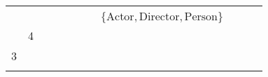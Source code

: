 \begin{table}[]
{\begin{tabular}{lllllllllll}
                          &                           &                   &                                                                          & \cellcolor[HTML]{FC8D59} &                           &                                                             &                                                                            &                                                                           &                                 &                                                                        \\
                          &                           &                   &                                                                          &                                                                        &                           &                                                             & \cellcolor[HTML]{FC8D59}$\{\text{Actor}, \text{Director}, \text{Person}\}$ &                                                                           &                                 &                                                                        \\
                          & \cellcolor[HTML]{FC8D59}4 &                   &                                                                          &                                                                        &                           &                                                             &                                                                            &                                                                           &                                 &                                                                        \\
\cellcolor[HTML]{FC8D59}3 &                           &                   &                                                                          &                                                                        &                           &                                                             &                                                                            &                                                                           &                                 &                                                                        \\
                          &                           &                   & \cellcolor[HTML]{FC8D59}    &                                                                        &                           &                                                             &                                                                            &                                                                           &                                 &                                                                       
\end{tabular}%
}
\end{table}
